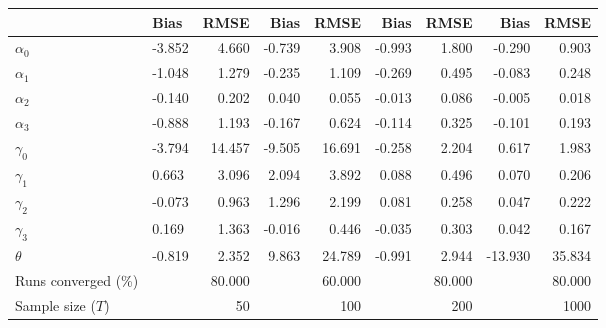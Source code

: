 
\begin{tabular}[t]{llrrrrrrr}
\toprule
  & Bias & RMSE & Bias & RMSE & Bias & RMSE & Bias & RMSE\\
\midrule
$\alpha_{0}$ & -3.852 & 4.660 & -0.739 & 3.908 & -0.993 & 1.800 & -0.290 & 0.903\\
$\alpha_{1}$ & -1.048 & 1.279 & -0.235 & 1.109 & -0.269 & 0.495 & -0.083 & 0.248\\
$\alpha_{2}$ & -0.140 & 0.202 & 0.040 & 0.055 & -0.013 & 0.086 & -0.005 & 0.018\\
$\alpha_{3}$ & -0.888 & 1.193 & -0.167 & 0.624 & -0.114 & 0.325 & -0.101 & 0.193\\
$\gamma_{0}$ & -3.794 & 14.457 & -9.505 & 16.691 & -0.258 & 2.204 & 0.617 & 1.983\\
$\gamma_{1}$ & 0.663 & 3.096 & 2.094 & 3.892 & 0.088 & 0.496 & 0.070 & 0.206\\
$\gamma_{2}$ & -0.073 & 0.963 & 1.296 & 2.199 & 0.081 & 0.258 & 0.047 & 0.222\\
$\gamma_{3}$ & 0.169 & 1.363 & -0.016 & 0.446 & -0.035 & 0.303 & 0.042 & 0.167\\
$\theta$ & -0.819 & 2.352 & 9.863 & 24.789 & -0.991 & 2.944 & -13.930 & 35.834\\
Runs converged (\%) &  & 80.000 &  & 60.000 &  & 80.000 &  & 80.000\\
Sample size ($T$) &  & 50 &  & 100 &  & 200 &  & 1000\\
\bottomrule
\end{tabular}
